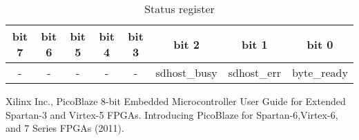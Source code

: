 \documentclass[oneside]{article}
\begin{document}
\begin{table}[htp]

\centering
\begin{tabular}{ | c | c | c | c | c | c | c | c |}
\hline
  \bfseries bit 7 & \bfseries bit 6 & 
  \bfseries bit 5 & \bfseries bit 4 & \bfseries bit 3 &
  \bfseries bit 2 & \bfseries bit 1 & \bfseries bit 0 \\
 \hline
  - & - & - & - & - & 
  sdhost\_busy &  sdhost\_err & byte\_ready  \\
 \hline
\end{tabular}
\caption{Status register}
\label{tab-status-register}
\end{table}



\begin{thebibliography}{1}

Xilinx Inc., PicoBlaze 8-bit Embedded Microcontroller User Guide for 
Extended
  Spartan-3 and Virtex-5 FPGAs. Introducing PicoBlaze for Spartan-6,Virtex-6,
  and 7 Series FPGAs (2011).
 
\end{thebibliography}
\end{document}
